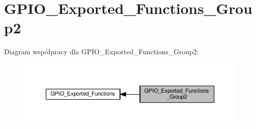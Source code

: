\hypertarget{group___g_p_i_o___exported___functions___group2}{}\section{G\+P\+I\+O\+\_\+\+Exported\+\_\+\+Functions\+\_\+\+Group2}
\label{group___g_p_i_o___exported___functions___group2}
Diagram współpracy dla G\+P\+I\+O\+\_\+\+Exported\+\_\+\+Functions\+\_\+\+Group2\+:\nopagebreak
\begin{figure}[H]
\begin{center}
\leavevmode
\includegraphics[width=350pt]{group___g_p_i_o___exported___functions___group2}
\end{center}
\end{figure}
